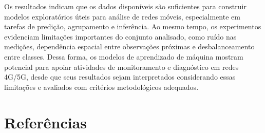 \documentclass[11pt,a4paper]{article}
\begin{document}
Os resultados indicam que os dados disponíveis são suficientes para construir modelos exploratórios úteis para análise de redes móveis, especialmente em tarefas de predição, agrupamento e inferência. Ao mesmo tempo, os experimentos evidenciam limitações importantes do conjunto analisado, como ruído nas medições, dependência espacial entre observações próximas e desbalanceamento entre classes. Dessa forma, os modelos de aprendizado de máquina mostram potencial para apoiar atividades de monitoramento e diagnóstico em redes 4G/5G, desde que seus resultados sejam interpretados considerando essas limitações e avaliados com critérios metodológicos adequados.


\newpage

\section{Referências}
\end{document}
